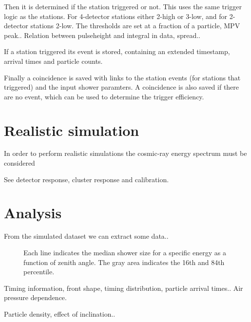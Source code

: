 Then it is determined if the station triggered or not. This uses the same trigger logic as the \hisparc stations. For 4-detector stations either 2-high or 3-low, and for 2-detector stations 2-low. The thresholds are set at a fraction of a particle, MPV peak..
Relation between pulseheight and integral in data, spread..

If a station triggered its event is stored, containing an extended timestamp, arrival times and particle counts.

Finally a coincidence is saved with links to the station events (for stations that triggered) and the input shower paramters. A coincidence is also saved if there are no event, which can be used to determine the trigger efficiency.


\section{Realistic simulation}

In order to perform realistic simulations the cosmic-ray energy spectrum must be considered 



See detector response, cluster response and calibration.


\section{Analysis}


From the simulated dataset we can extract some data..

\begin{figure}
    \centering
    
    \caption{
             Each line indicates the median shower size for a specific
             energy as a function of zenith angle. The gray area
             indicates the 16th and 84th percentile.}
    \label{fig:simulations_shower_sizes}
\end{figure}

Timing information, front shape, timing distribution, particle arrival times..
Air pressure dependence.

Particle density, effect of inclination..
